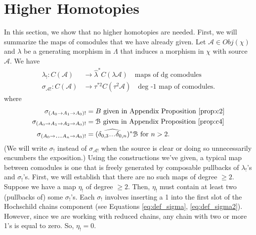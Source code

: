 \section{Higher Homotopies}
In this section, we show 
that no higher homotopies are needed. 
First, we will summarize the 
maps of comodules that we have 
already given. Let 
$\mathcal{A} \in Obj(\chi)$ and 
$\lambda$ be a generating morphism in $\Lambda$ 
that induces a morphism in $\chi$ with 
source $\mathcal{A}$. We have 
\begin{align*}
\lambda_!: C(\mathcal{A})
&\to 
\hat{\lambda}^*C(\lambda\mathcal{A})
  \quad \textrm{maps of dg comodules}\\
\sigma_{\mathcal{A}!}:
  C(\mathcal{A}) 
&\to 
\tau^{*2}C(\tau^2\mathcal{A})
  \quad \textrm{deg -1 map of comodules.}
\end{align*}
where
\begin{align*}
\sigma_{(A_0 \to A_1 \to A_0)!}
&= 
B \textrm{ given in Appendix 
  Proposition \ref{prop:c2}}\\
\sigma_{(A_0 \to A_1 \to A_2 \to A_0)!}
&= 
\mathcal{B} \textrm{ given in Appendix 
  Proposition \ref{prop:c4}}\\
\sigma_{(A_0 \to \smdots A_n \to A_0)!}
&= 
(\widehat{\delta_{0,3}\smdots\delta_{0,n}})^*
  \mathcal{B} \textrm{ for } n>2.\\  
\end{align*}
(We will write $\sigma_!$ instead of 
$\sigma_{\mathcal{A}!}$ when the source 
is clear or doing so unnecessarily 
encumbers the exposition.) 
Using the constructions we've given, 
a typical map between comodules is 
one that is freely generated by composable 
pullbacks of $\lambda_!$'s and $\sigma_!$'s. 
First, we will establish that there are 
no such maps of degree $\geq2$. Suppose 
we have a map $\eta_!$ of degree 
$\geq2$. Then, $\eta_!$ must contain at 
least two (pullbacks of) some $\sigma_!$'s. 
Each $\sigma_!$ involves inserting a 1 
into the first slot of the Hochschild 
chains component (see Equations 
\ref{eq:def_sigma}, \ref{eq:def_sigma2}). 
However, since we are working with 
reduced chains, any chain with two or 
more 1's is equal to zero. So, 
$\eta_! = 0$.

